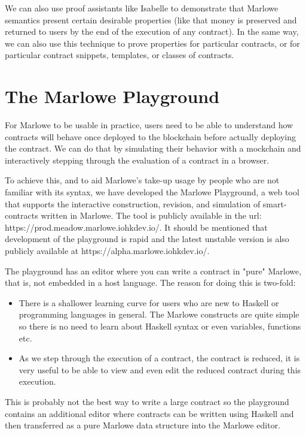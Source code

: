 \documentclass[runningheads]{llncs}
\begin{document}
We can also use proof assistants like Isabelle to demonstrate that Marlowe semantics present certain desirable properties (like that money is preserved and returned to users by the end of the execution of any contract). In the same way, we can also use this technique to prove properties for particular contracts, or for particular contract snippets, templates, or classes of contracts.

\clearpage
\section{The Marlowe Playground}

For Marlowe to be usable in practice, users need to be able to understand how contracts will behave once deployed to the blockchain before actually deploying the contract. We can do that by simulating their behavior with a mockchain and interactively stepping through the evaluation of a contract in a browser.

To achieve this, and to aid Marlowe’s take-up usage by people who are not familiar with its syntax, we have developed the Marlowe Playground, a web tool that supports the interactive construction, revision, and simulation of smart-contracts written in Marlowe. The tool is publicly available in the url: https://prod.meadow.marlowe.iohkdev.io/. It should be mentioned that development of the playground is rapid and the latest unstable version is also publicly available at https://alpha.marlowe.iohkdev.io/.

The playground has an editor where you can write a contract in "pure" Marlowe, that is, not embedded in a host language. The reason for doing this is two-fold:
\begin{itemize}
    \item There is a shallower learning curve for users who are new to Haskell or programming languages in general. The Marlowe constructs are quite simple so there is no need to learn about Haskell syntax or even variables, functions etc.
    \item As we step through the execution of a contract, the contract is reduced, it is very useful to be able to view and even edit the reduced contract during this execution.
\end{itemize}
This is probably not the best way to write a large contract so the playground contains an additional editor where contracts can be written using Haskell and then transferred as a pure Marlowe data structure into the Marlowe editor.
\end{document}

